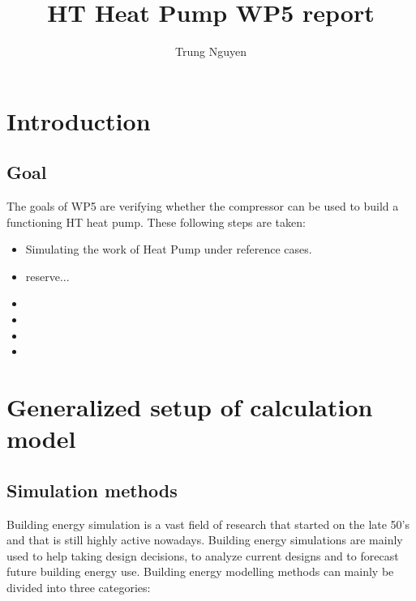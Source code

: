 \documentclass[a4paper,10pt]{article}
\title{HT Heat Pump WP5 report}
\author{Trung Nguyen}
\date{}
\begin{document}
\maketitle

\tableofcontents

\section{Introduction}
\subsection{Goal}

The goals of WP5 are verifying whether the compressor can be used to build a functioning HT heat pump. These following steps are taken:   

\begin{itemize}
    \item Simulating the work of Heat Pump under reference cases.
    \item reserve...
    \item
    \item
    \item
    \item
\end{itemize}



\section{Generalized setup of calculation model}

\subsection{Simulation methods}

Building energy simulation is a vast field of research that started on the late 50’s and that is still highly active nowadays. Building energy simulations are mainly used to help taking design decisions, to analyze current designs and to forecast future building energy use. Building energy modelling methods can mainly be divided into three categories: 
\end{document}

